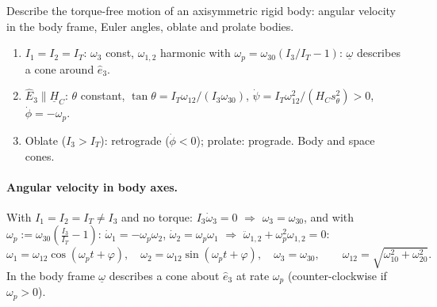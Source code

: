 \begin{qbox}
Describe the torque-free motion of an axisymmetric rigid body: angular velocity in the body frame, Euler angles, oblate and prolate bodies.
\end{qbox}
\begin{outline}
\begin{enumerate}
\item $I_1=I_2=I_T$: $\omega_3$ const, $\omega_{1,2}$ harmonic with $\omega_p=\omega_{30}(I_3/I_T-1)$: $\underline\omega$ describes a cone around $\hat e_3$.
\item $\hat E_3\parallel\underline H_C$: $\theta$ constant, $\tan\theta=I_T\omega_{12}/(I_3\omega_{30})$, $\dot\psi=I_T\omega_{12}^2/(H_Cs_\theta^2)>0$, $\dot\phi=-\omega_p$.
\item Oblate ($I_3>I_T$): retrograde ($\dot\phi<0$); prolate: prograde. Body and space cones.
\end{enumerate}
\end{outline}
\answer
\paragraph{Angular velocity in body axes.} With $I_1=I_2=I_T\neq I_3$ and no torque: $I_3\dot\omega_3=0$ $\Rightarrow$ $\omega_3=\omega_{30}$, and with
$\omega_p:=\omega_{30}\left(\frac{I_3}{I_T}-1\right)$: $\dot\omega_1=-\omega_p\omega_2$, $\dot\omega_2=\omega_p\omega_1$ $\Rightarrow$ $\ddot\omega_{1,2}+\omega_p^2\omega_{1,2}=0$:
\begin{equation}
\omega_1=\omega_{12}\cos(\omega_pt+\varphi),\quad \omega_2=\omega_{12}\sin(\omega_pt+\varphi),\quad \omega_3=\omega_{30},\qquad \omega_{12}=\sqrt{\omega_{10}^2+\omega_{20}^2}.
\end{equation}
In the body frame $\underline\omega$ describes a cone about $\hat e_3$ at rate $\omega_p$ (counter-clockwise if $\omega_p>0$).
